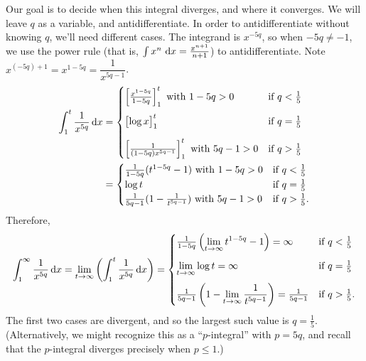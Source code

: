 \begin{solution}
Our goal is to decide when this integral diverges, and where it converges. We will leave $q$ as a variable, and antidifferentiate. In order to antidifferentiate without knowing $q$, we'll need different cases.
The integrand is $x^{-5q}$, so when $-5q \neq -1$, we use the power rule (that is, $\int x^n~\mathrm{d}x = \frac{x^{n+1}}{n+1}$) to antidifferentiate.  Note $x^{(-5q)+1} = x^{1-5q} = \dfrac{1}{x^{5q-1}}$.
\begin{align*}
\int_1^t \frac1{x^{5q}}\,\mathrm{d}x &= \begin{cases}
\left[\frac{x^{1-5q}}{1-5q} \right]_1^t \text{ with }1-5q>0 &\text{if } q < \frac15 \\[10pt]
\left[ \log x\vphantom{\frac12}\right]_1^{t}\  &\text{if } q = \frac15 \\[10pt]
\left[\frac{1}{(1-5q)x^{5q-1}} \right]_1^{t}\text{ with }5q-1>0 &\text{if } q > \frac15
\end{cases}\\
&=\begin{cases}
\frac1{1-5q}(t^{1-5q}-1) \text{ with }1-5q>0 &\text{if } q < \frac15 \\
\log t &\text{if } q = \frac15 \\
\frac1{5q-1}(1-\frac1{t^{5q-1}})\text{ with }5q-1>0 &\text{if } q > \frac15.
\end{cases}
\end{align*}
Therefore,
\begin{align*}
\int_1^\infty \frac1{x^{5q}}\,\mathrm{d}x = \displaystyle\lim_{t\to\infty} \left( \int_1^t \frac1{x^{5q}}\,\mathrm{d}x \right) = \begin{cases}
\frac1{1-5q}\left(\displaystyle\lim_{t\to\infty} t^{1-5q}-1\right) = \infty &\text{if } q < \frac15 \\[10pt]
\displaystyle\lim_{t\to\infty}\log t = \infty &\text{if } q = \frac15 \\[10pt]
\frac1{5q-1}\left(1-\displaystyle\lim_{t\to\infty}\frac1{t^{5q-1}}\right) = \frac1{5q-1} &\text{if } q > \frac15.
\end{cases}
\end{align*}
The first two cases are divergent, and so the largest such value is $q=\frac{1}{5}$. (Alternatively, we might recognize this as a ``$p$-integral'' with $p=5q$, and recall that the $p$-integral diverges precisely when $p\le1$.)

\end{solution}


